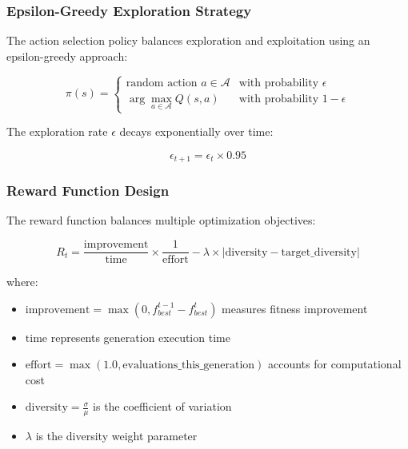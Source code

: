 \documentclass[12pt,a4paper]{article}
\begin{document}
\subsubsection{Epsilon-Greedy Exploration Strategy}

The action selection policy balances exploration and exploitation using an epsilon-greedy approach:

\begin{equation}\label{Eq.epsilon_greedy}
\pi(s) = \begin{cases}
\text{random action } a \in \mathcal{A} & \text{with probability } \epsilon \\
\arg\max_{a \in \mathcal{A}} Q(s, a) & \text{with probability } 1-\epsilon
\end{cases}
\end{equation}

The exploration rate $\epsilon$ decays exponentially over time:

\begin{equation}\label{Eq.epsilon_decay}
\epsilon_{t+1} = \epsilon_t \times 0.95
\end{equation}

\subsubsection{Reward Function Design}

The reward function balances multiple optimization objectives:

\begin{equation}\label{Eq.rl_reward}
R_t = \frac{\text{improvement}}{\text{time}} \times \frac{1}{\text{effort}} - \lambda \times |\text{diversity} - \text{target\_diversity}|
\end{equation}

where:
\begin{itemize}
\item $\text{improvement} = \max(0, f_{best}^{t-1} - f_{best}^t)$ measures fitness improvement
\item $\text{time}$ represents generation execution time
\item $\text{effort} = \max(1.0, \text{evaluations\_this\_generation})$ accounts for computational cost
\item $\text{diversity} = \frac{\sigma}{\mu}$ is the coefficient of variation
\item $\lambda$ is the diversity weight parameter
\end{itemize}
\end{document}

